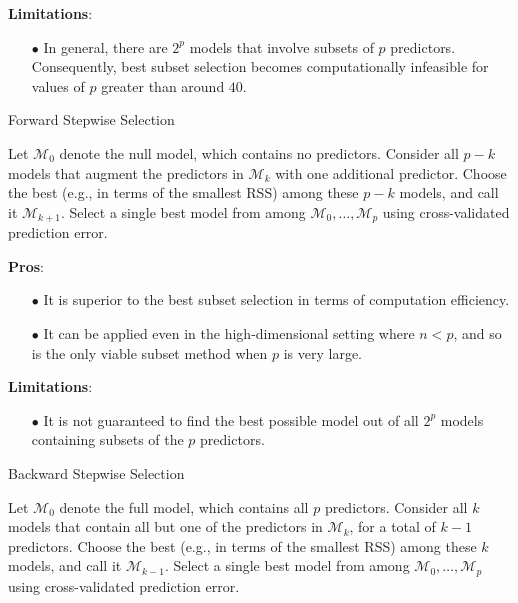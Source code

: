 \documentclass[10pt]{article}
\begin{document}
\begin{enumerate}[1.]
\begin{itemize}
	 \textbf{Limitations}: 
	 \begin{itemize}
	 	\item[$\bullet$] In general,
there are $2^{p}$ models that involve subsets of $p$ predictors. Consequently, best subset selection becomes computationally infeasible for values of $p$ greater than
around $40$.
	 \end{itemize}
\begin{algorithm}[t]
	\caption{Forward Stepwise Selection} 
	\begin{algorithmic}[1]
		\State Let $\mathcal{M}_{0}$ denote the null model, which contains no predictors.
		\State  Consider all $p-k$ models that augment the predictors in $\mathcal{M}_{k}$ with one additional predictor.
		\State Choose the best (e.g., in terms of the smallest RSS) among these $p-k$ models, and call it $\mathcal{M}_{k+1}$. 
		\EndFor
		\State Select a single best model from among $\mathcal{M}_{0},\ldots,\mathcal{M}_{p}$ using cross-validated prediction error.
	\end{algorithmic} 
\end{algorithm}

	\textbf{Pros}: 
\begin{itemize}
	\item[$\bullet$] It is superior to the best subset
selection in terms of computation efficiency.
	
	\item[$\bullet$] It can be applied even in the high-dimensional setting where $n<p$, and so is the only viable subset method when $p$ is very large.
\end{itemize}  

\textbf{Limitations}: 
\begin{itemize}
	\item[$\bullet$] It is not guaranteed to find the best possible model out of all $2^{p}$ models containing subsets of the $p$ predictors. 
\end{itemize}    	 	
\begin{algorithm}[t]
	\caption{Backward Stepwise Selection} 
	\begin{algorithmic}[1]
		\State Let $\mathcal{M}_{0}$ denote the full model, which contains all $p$ predictors.
		\State  Consider all $k$ models that contain all but one of the predictors
in $\mathcal{M}_{k}$, for a total of $k-1$ predictors.
		\State Choose the best (e.g., in terms of the smallest RSS) among these $k$ models, and call it $\mathcal{M}_{k-1}$. 
		\EndFor
		\State Select a single best model from among $\mathcal{M}_{0},\ldots,\mathcal{M}_{p}$ using cross-validated prediction error.
	\end{algorithmic} 
\end{algorithm}


\end{itemize}
\end{enumerate}
\end{document}
